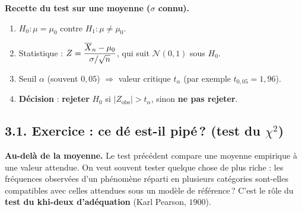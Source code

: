 \begin{center}
\end{center}

\medskip

\begin{mdframed}[backgroundcolor=ThemeLight, linecolor=Theme,
  linewidth=1pt, innertopmargin=8pt, innerbottommargin=8pt, nobreak=true]
\textbf{Recette du test sur une moyenne ($\sigma$ connu).}
\begin{enumerate}
  \item $H_0 : \mu = \mu_0$ \quad contre \quad $H_1 : \mu \neq \mu_0$.
  \item Statistique : $Z = \dfrac{\overline{X}_n - \mu_0}{\sigma/\sqrt{n}}$, qui suit $\mathcal{N}(0,1)$ sous $H_0$.
  \item Seuil $\alpha$ (souvent $0{,}05$) $\Longrightarrow$ valeur critique $t_\alpha$ (par exemple $t_{0{,}05}=1{,}96$).
  \item \textbf{Décision} : \textbf{rejeter} $H_0$ si $|Z_{\text{obs}}| > t_\alpha$, sinon \textbf{ne pas rejeter}.
\end{enumerate}
\end{mdframed}

\subsection*{3.1. Exercice : ce dé est-il pipé\,? (test du \texorpdfstring{$\chi^2$}{khi-deux})}

\textbf{Au-delà de la moyenne.} Le test précédent compare une moyenne empirique à une valeur attendue. On veut souvent tester quelque chose de plus riche : \og les fréquences observées d'un phénomène réparti en plusieurs catégories sont-elles compatibles avec celles attendues sous un modèle de référence\,? \fg{} C'est le rôle du \textbf{test du khi-deux d'adéquation} (Karl Pearson, $1900$).

